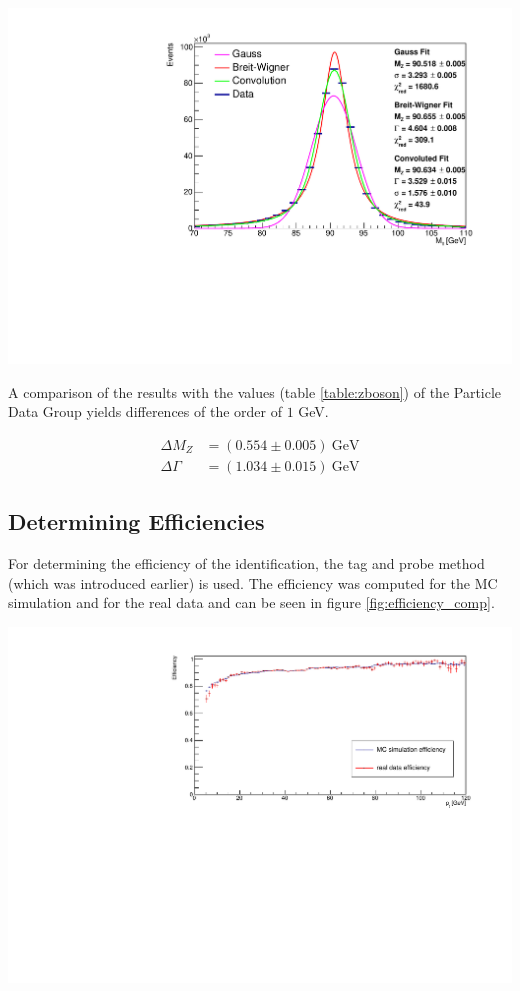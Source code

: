\documentclass[12pt, a4paper, bibliography=totoc]{scrartcl}
\begin{document}
\begin{multicols}{2}
\begin{center}
	\includegraphics[width=\linewidth]{fig/invar_z_mass.pdf}
	\label{fig:fit}
\end{center}

A comparison of the results with the values (table \ref{table:zboson}) of the Particle Data Group yields differences of the order of $1$ GeV.
 
\begin{align}
\Delta M_Z &= (0.554 \pm 0.005) \ \text{GeV}\\
\Delta \Gamma &= (1.034 \pm 0.015) \ \text{GeV}
\end{align}
 
\subsection{Determining Efficiencies}
For determining the efficiency of the identification, the tag and probe method (which was introduced earlier) is used.
The efficiency was computed for the MC simulation and for the real data and can be seen in figure \ref{fig:efficiency_comp}.

\begin{center}
    \includegraphics[width=1.1\linewidth]{fig/efficency_comparison_v2.pdf}
    \label{fig:efficiency_comp}
\end{center}


\end{multicols}
\end{document}
